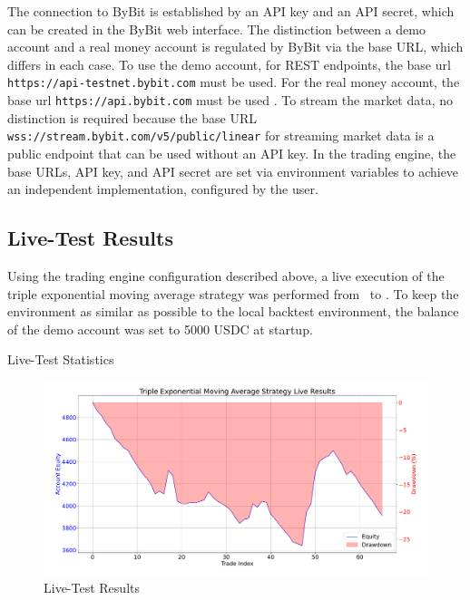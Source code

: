 \noindent
The connection to ByBit is established by an API key and an API secret, which can be created in the ByBit web interface.
The distinction between a demo account and a real money account is regulated by ByBit via the base URL, which differs in each case.
To use the demo account, for REST endpoints, the base url \texttt{https://api-testnet.bybit.com} must be used.
For the real money account, the base url \texttt{https://api.bybit.com} must be used \cite{integration}.
To stream the market data, no distinction is required because the base URL \texttt{wss://stream.bybit.com/v5/public/linear} \cite{ws-connect} for streaming market data is a public endpoint that can be used without an API key.
In the trading engine, the base URLs, API key, and API secret are set via environment variables to achieve an independent implementation, configured by the user.

\subsection{Live-Test Results}

Using the trading engine configuration described above, a live execution of the triple exponential moving average strategy was performed from \liveStartDataStartDate~to \liveStartDataEndDate.
To keep the environment as similar as possible to the local backtest environment, the balance of the demo account was set to 5000 USDC at startup.

\begin{table}[H]
    \centering
    
    \caption{Live-Test Statistics}
    \label{tbl:live-results}
\end{table}

\begin{figure}[H]
    \centering
    \includegraphics[width=\textwidth]{images/live/live-result}
    \caption{Live-Test Results}
    \label{fig:live-results}
\end{figure}

